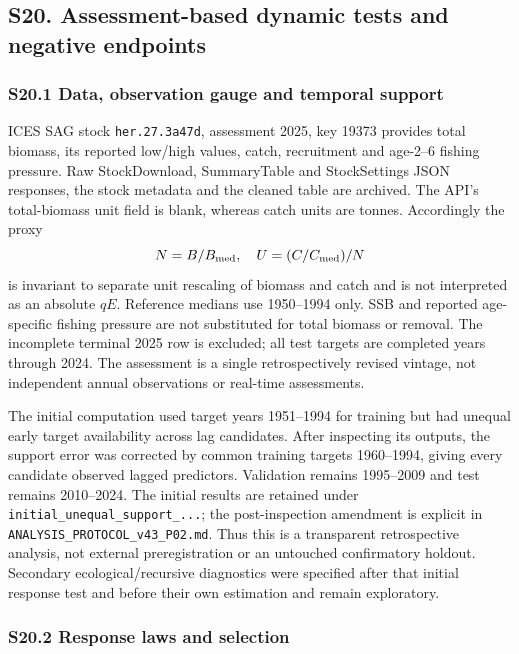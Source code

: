 \documentclass[
  10pt,
  a4paper,
]{article}
\begin{document}
\subsection{S20. Assessment-based dynamic tests and negative
endpoints}\label{s20.-assessment-based-dynamic-tests-and-negative-endpoints}

\subsubsection{S20.1 Data, observation gauge and temporal
support}\label{s20.1-data-observation-gauge-and-temporal-support}

ICES SAG stock \texttt{her.27.3a47d}, assessment 2025, key 19373
provides total biomass, its reported low/high values, catch, recruitment
and age-2--6 fishing pressure. Raw StockDownload, SummaryTable and
StockSettings JSON responses, the stock metadata and the cleaned table
are archived. The API's total-biomass unit field is blank, whereas catch
units are tonnes. Accordingly the proxy
\[N=B/B_{\rm med},\quad U=(C/C_{\rm med})/N\] is invariant to separate
unit rescaling of biomass and catch and is not interpreted as an
absolute \(qE\). Reference medians use 1950--1994 only. SSB and reported
age-specific fishing pressure are not substituted for total biomass or
removal. The incomplete terminal 2025 row is excluded; all test targets
are completed years through 2024. The assessment is a single
retrospectively revised vintage, not independent annual observations or
real-time assessments.

The initial computation used target years 1951--1994 for training but
had unequal early target availability across lag candidates. After
inspecting its outputs, the support error was corrected by common
training targets 1960--1994, giving every candidate observed lagged
predictors. Validation remains 1995--2009 and test remains 2010--2024.
The initial results are retained under
\texttt{initial\_unequal\_support\_...}; the post-inspection amendment
is explicit in \texttt{ANALYSIS\_PROTOCOL\_v43\_P02.md}. Thus this is a
transparent retrospective analysis, not external preregistration or an
untouched confirmatory holdout. Secondary ecological/recursive
diagnostics were specified after that initial response test and before
their own estimation and remain exploratory.

\subsubsection{S20.2 Response laws and
selection}\label{s20.2-response-laws-and-selection}
\end{document}
